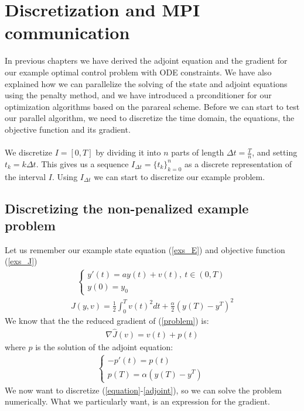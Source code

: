 \chapter{Discretization and MPI communication}
In previous chapters we have derived the adjoint equation and the gradient for our example optimal control problem with ODE constraints. We have also explained how we can parallelize the solving of the state and adjoint equations using the penalty method, and we have introduced a prconditioner for our optimization algorithms based on the parareal scheme. Before we can start to test our parallel algorithm, we need to discretize the time domain, the equations, the objective function and its gradient. 
\\
\\
We discretize $I=[0,T]$ by dividing it into $n$ parts of length $\Delta t=\frac{T}{n}$, and setting $t_k=k\Delta t$. This gives us a sequence $I_{\Delta t}=\{t_k\}_{k=0}^{n}$ as a discrete representation of the interval $I$. Using $I_{\Delta t}$ we can start to discretize our example problem.
\section{Discretizing the non-penalized example problem}
Let us remember our example state equation (\ref{exs_E}) and objective function (\ref{exs_J}) 
\begin{align}
\left\{
     \begin{array}{lr}
       	y'(t)=a y(t) +v(t), \ t \in (0,T)\\
       	   y(0)=y_0
     \end{array}
   \right. \label{equation}
\end{align}
\begin{align}
J(y,v) = \frac{1}{2}\int_0^Tv(t)^2dt + \frac{\alpha}{2}(y(T)-y^T)^2
\label{problem}
\end{align}
We know that the the reduced gradient of (\ref{problem}) is:
\begin{align}
\nabla\hat{J}(v) = v(t)+p(t) \label{gradiant}
\end{align}
where $p$ is the solution of the adjoint equation:
\begin{align}   
  \left\{
     \begin{array}{lr}
	-p'(t) = p(t) \\
	p(T) = \alpha( y(T)-y^T)     \
	\end{array}
   \right. \label{adjoint}
\end{align}
We now want to discretize (\ref{equation}-\ref{adjoint}), so we can solve the problem numerically. What we particularly want, is an expression for the gradient. 
